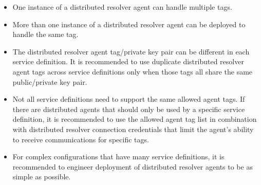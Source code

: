 \begin{itemize}
  \item One instance of a distributed resolver agent can handle multiple tags.
  
  \item More than one instance of a distributed resolver agent can be deployed to handle the same tag.

  \item The distributed resolver agent tag/private key pair can be different in each service definition.  It is recommended to
  use duplicate distributed resolver agent tags across \cxoneflow service definitions only when those tags all share the same public/private
  key pair.

  \item Not all service definitions need to support the same allowed agent tags.  If there are distributed agents
  that should only be used by a specific service definition, it is recommended to use the allowed agent tag list
  in combination with distributed resolver connection credentials that limit the agent's ability to receive
  communications for specific tags.

  \item For complex \cxoneflow configurations that have many service definitions, it is recommended to engineer
  deployment of distributed resolver agents to be as simple as possible.
    
\end{itemize}


